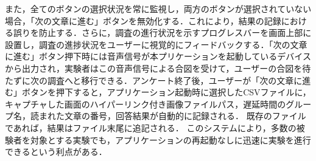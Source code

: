 また，全てのボタンの選択状況を常に監視し，両方のボタンが選択されていない場合，「次の文章に進む」ボタンを無効化する．これにより，結果の記録における誤りを防止する．さらに，調査の進行状況を示すプログレスバーを画面上部に設置し，調査の進捗状況をユーザーに視覚的にフィードバックする．「次の文章に進む」ボタン押下時には音声信号が本プリケーションを起動しているデバイスから出力され，実験者はこの音声信号による合図を受けて，ユーザーの合図を待たずに次の調査へと移行できる．アンケート終了後，ユーザーが「次の文章に進む」ボタンを押下すると，アプリケーション起動時に選択したCSVファイルに，キャプチャした画面のハイパーリンク付き画像ファイルパス，遅延時間のグループ名，読まれた文章の番号，回答結果が自動的に記録される．
既存のファイルであれば，結果はファイル末尾に追記される．
このシステムにより，多数の被験者を対象とする実験でも，アプリケーションの再起動なしに迅速に実験を進行できるという利点がある．
